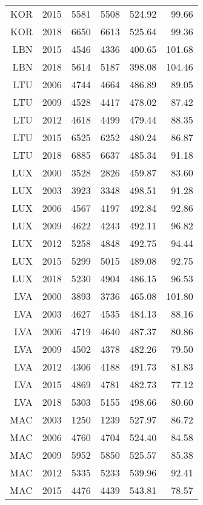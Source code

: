 \begin{longtable}{|r|r|r|r|r|r|}
    KOR   & 2015  & 5581  & 5508  & 524.92 & 99.66 \\
    KOR   & 2018  & 6650  & 6613  & 525.64 & 99.36 \\
    LBN   & 2015  & 4546  & 4336  & 400.65 & 101.68 \\
    LBN   & 2018  & 5614  & 5187  & 398.08 & 104.46 \\
    LTU   & 2006  & 4744  & 4664  & 486.89 & 89.05 \\
    LTU   & 2009  & 4528  & 4417  & 478.02 & 87.42 \\
    LTU   & 2012  & 4618  & 4499  & 479.44 & 88.35 \\
    LTU   & 2015  & 6525  & 6252  & 480.24 & 86.87 \\
    LTU   & 2018  & 6885  & 6637  & 485.34 & 91.18 \\
    LUX   & 2000  & 3528  & 2826  & 459.87 & 83.60 \\
    LUX   & 2003  & 3923  & 3348  & 498.51 & 91.28 \\
    LUX   & 2006  & 4567  & 4197  & 492.84 & 92.86 \\
    LUX   & 2009  & 4622  & 4243  & 492.11 & 96.82 \\
    LUX   & 2012  & 5258  & 4848  & 492.75 & 94.44 \\
    LUX   & 2015  & 5299  & 5015  & 489.08 & 92.75 \\
    LUX   & 2018  & 5230  & 4904  & 486.15 & 96.53 \\
    LVA   & 2000  & 3893  & 3736  & 465.08 & 101.80 \\
    LVA   & 2003  & 4627  & 4535  & 484.13 & 88.16 \\
    LVA   & 2006  & 4719  & 4640  & 487.37 & 80.86 \\
    LVA   & 2009  & 4502  & 4378  & 482.26 & 79.50 \\
    LVA   & 2012  & 4306  & 4188  & 491.73 & 81.83 \\
    LVA   & 2015  & 4869  & 4781  & 482.73 & 77.12 \\
    LVA   & 2018  & 5303  & 5155  & 498.66 & 80.60 \\
    MAC   & 2003  & 1250  & 1239  & 527.97 & 86.72 \\
    MAC   & 2006  & 4760  & 4704  & 524.40 & 84.58 \\
    MAC   & 2009  & 5952  & 5850  & 525.57 & 85.38 \\
    MAC   & 2012  & 5335  & 5233  & 539.96 & 92.41 \\
    MAC   & 2015  & 4476  & 4439  & 543.81 & 78.57 \\

\end{longtable}
